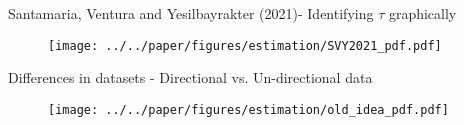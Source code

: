 \documentclass[aspectratio=169,10pt,hyperref={colorlinks,linkcolor={red!50!black},citecolor={blue!90!black},urlcolor={blue!80!black}},usenames,dvipsnames]{beamer}
\begin{document}
\begin{frame}{Santamaria, Ventura and Yesilbayrakter (2021)- Identifying $\tau$ graphically}
  \vspace{-15pt}
  \begin{figure}[H]
    \centering
      \texttt{[image: ../../paper/figures/estimation/SVY2021\_pdf.pdf]}
 \end{figure} 
\end{frame}

\begin{frame}{Differences in datasets - Directional vs. Un-directional data}
  \vspace{-15pt}
  \begin{figure}[H]
    \centering
      \texttt{[image: ../../paper/figures/estimation/old\_idea\_pdf.pdf]}
 \end{figure} 
\end{frame}
\end{document}

